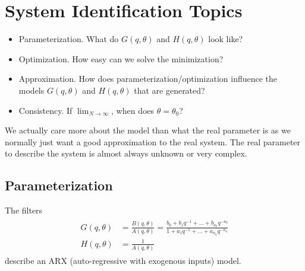 \section{System Identification Topics}
\begin{itemize}
\item Parameterization. What do $G(q,\theta)$ and $H(q,\theta)$ look like?
\item Optimization. How easy can we solve the minimization?
\item Approximation. How does parameterization/optimization influence the models $G(q,\theta)$ and $H(q,\theta)$ that are generated?
\item Consistency. If $\lim_{N\to\infty}$, when does $\theta=\theta_0$?
\end{itemize}
We actually care more about the model than what the real parameter is as we normally just want a good approximation to the real system. The real parameter to describe the system is almost always unknown or very complex.

\subsection{Parameterization}
The filters
\begin{align}
\label{eq:arxmodel}
\begin{split}
G(q,\theta) &= \frac{B(q,\theta)}{A(q,\theta)} = \frac{b_0+b_1q^{-1}+\ldots+b_{n_b}q^{-n_b}}{1+a_1q^{-1}+\ldots+a_{n_a}q^{-n_a}} \\
H(q,\theta) &= \frac{1}{A(q,\theta)}
\end{split}
\end{align}
describe an ARX (auto-regressive with exogenous inputs) model.

